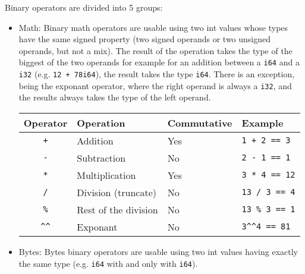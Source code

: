 Binary operators are divided into 5 groups:
\begin{itemize}
\item Math: Binary math operators are usable using two int values whose types
  have the same signed property (two signed operands or two unsigned operands,
  but not a mix). The result of the operation takes the type of the biggest of
  the two operands for example for an addition between a \texttt{i64} and a
  \texttt{i32} (e.g. \texttt{12 + 78i64}), the result takes the type
  \texttt{i64}. There is an exception, being the exponant operator, where the
  right operand is always a \texttt{i32}, and the results always takes the type
  of the left operand.


  \begin{center}
    \vspace{-10pt}
    \begin{adjustbox}{max width=1.0\linewidth}
      \begin{tabular}{|c|lll|}
        \hline
        Operator & Operation & Commutative & Example\\[0pt]
        \hline
        \hline
        \texttt{+} & Addition & Yes & \texttt{1 + 2 == 3}\\[0pt]
        \texttt{-} & Subtraction & No & \texttt{2 - 1 == 1}\\[0pt]
        \texttt{*} & Multiplication & Yes & \texttt{3 * 4 == 12}\\[0pt]
        \texttt{/} & Division (truncate) & No & \texttt{13 / 3 == 4}\\[0pt]
        \texttt{\%} & Rest of the division & No & \texttt{13 \% 3 == 1}\\[0pt]
        \texttt{\textasciicircum{}\textasciicircum{}} & Exponant & No & \texttt{3\textasciicircum{}\textasciicircum{}4 == 81}\\[0pt]
        \hline
      \end{tabular}
    \end{adjustbox}
  \end{center}

\item Bytes: Bytes binary operators are usable using two int values having
  exactly the same type (e.g. \texttt{i64} with and only with \texttt{i64}).


\end{itemize}
